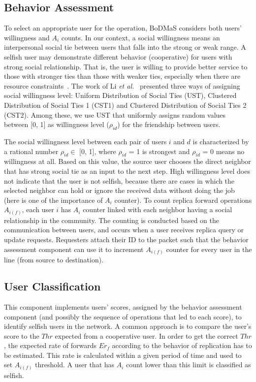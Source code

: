 \subsection{Behavior Assessment}\label{Chap6_04_02}
To select an appropriate user for the operation, BoDMaS considers both users' willingness and $A_i$ counts. In our context, a social willingness means an interpersonal social tie between users that falls into the strong or weak range. A selfish user may demonstrate different behavior (cooperative) for users with strong social relationship. That is, the user is willing to provide better service to those with stronger ties than those with weaker ties, especially when there are resource constraints~\cite{QLi2010}. The work of Li {\it et al.}~\cite{HLi2012} presented three ways of assigning social willingness level: Uniform Distribution of Social Ties (UST), Clustered Distribution of Social Ties 1 (CST1) and Clustered Distribution of Social Ties 2 (CST2). Among these, we use UST that uniformly assigns random values between [0, 1] as willingness level ($\rho_{id}$) for the friendship between users.

The social willingness level between each pair of users $i$ and $d$ is characterized by a rational number $\rho_{id} \in$ [0, 1], where $\rho_{id}$ = 1 is strongest and $\rho_{id}$ = 0 means no willingness at all. Based on this value, the source user chooses the direct neighbor that has strong social tie as an input to the next step. High willingness level does not indicate that the user is not selfish, because there are cases in which the selected neighbor can hold or ignore the received data without doing the job (here is one of the importance of $A_i$ counter). To count replica forward operations $A_{i(f)}$, each user $i$ has $A_i$ counter linked with each neighbor having a social relationship in the community. The counting is conducted based on the communication between users, and occurs when a user receives replica query or update requests. Requesters attach their ID to the packet such that the behavior assessment component can use it to increment $A_{i(f)}$ counter for every user in the line (from source to destination).

\subsection{User Classification}\label{Chap6_04_03}
This component implements users' scores, assigned by the behavior assessment component (and possibly the sequence of operations that led to each score), to identify selfish users in the network. A common approach is to compare the user's score to the $Thr$ expected from a cooperative user. In order to get the correct $Thr$, the expected rate of forwards $Er_f$ according to the behavior of replication has to be estimated. This rate is calculated within a given period of time and used to set $A_{i(f)}$ threshold. A user that has $A_i$ count lower than this limit is classified as selfish.

